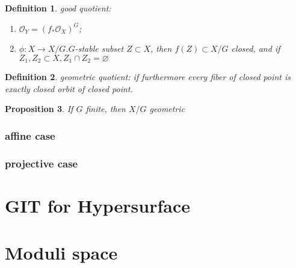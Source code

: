 \documentclass{article}
\newtheorem{defn}{Definition}[section]
\newtheorem{prop}[defn]{Proposition}
\begin{document}
\begin{defn}
	good quotient:
	\begin{enumerate}
		\item $ \mathcal{O}_Y=(f_*\mathcal{O}_X)^G $;
		\item $ \phi:X\to X/G $.$ G $-stable subset $ Z\subset{X} $, then $ f(Z) \subset X/G $ closed, and if $ Z_1,Z_2\subset X,Z_1\cap Z_2=\varnothing  $
	\end{enumerate}
\end{defn}

\begin{defn}
	geometric quotient: if furthermore every fiber of closed point is exactly closed orbit of closed point.
\end{defn}

\begin{prop}
	If $ G $ finite, then $ X/G $ geometric
\end{prop}

\subsubsection{affine case}


\subsubsection{projective case}

\section{GIT for Hypersurface}


\section{Moduli space}
\end{document}
